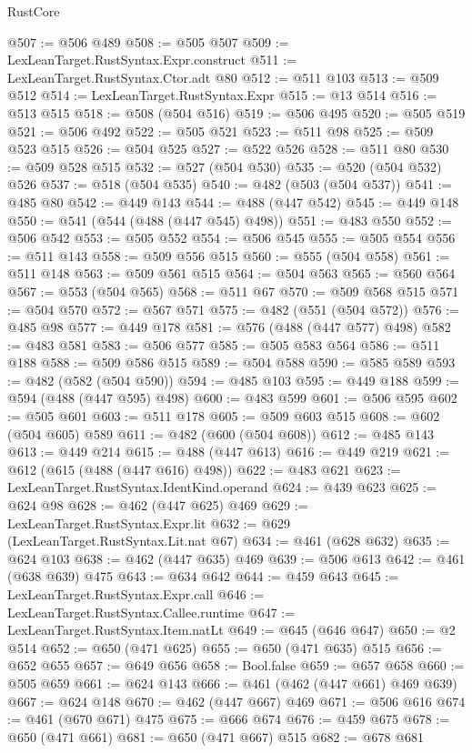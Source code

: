 \begin{lexlean}{RustCore}
\begin{coremodule}
@507 := @506 @489
@508 := @505 @507
@509 := LexLeanTarget.RustSyntax.Expr.construct
@511 := LexLeanTarget.RustSyntax.Ctor.adt @80
@512 := @511 @103
@513 := @509 @512
@514 := LexLeanTarget.RustSyntax.Expr
@515 := @13 @514
@516 := @513 @515
@518 := @508 (@504 @516)
@519 := @506 @495
@520 := @505 @519
@521 := @506 @492
@522 := @505 @521
@523 := @511 @98
@525 := @509 @523 @515
@526 := @504 @525
@527 := @522 @526
@528 := @511 @80
@530 := @509 @528 @515
@532 := @527 (@504 @530)
@535 := @520 (@504 @532) @526
@537 := @518 (@504 @535)
@540 := @482 (@503 (@504 @537))
@541 := @485 @80
@542 := @449 @143
@544 := @488 (@447 @542)
@545 := @449 @148
@550 := @541 (@544 (@488 (@447 @545) @498))
@551 := @483 @550
@552 := @506 @542
@553 := @505 @552
@554 := @506 @545
@555 := @505 @554
@556 := @511 @143
@558 := @509 @556 @515
@560 := @555 (@504 @558)
@561 := @511 @148
@563 := @509 @561 @515
@564 := @504 @563
@565 := @560 @564
@567 := @553 (@504 @565)
@568 := @511 @67
@570 := @509 @568 @515
@571 := @504 @570
@572 := @567 @571
@575 := @482 (@551 (@504 @572))
@576 := @485 @98
@577 := @449 @178
@581 := @576 (@488 (@447 @577) @498)
@582 := @483 @581
@583 := @506 @577
@585 := @505 @583 @564
@586 := @511 @188
@588 := @509 @586 @515
@589 := @504 @588
@590 := @585 @589
@593 := @482 (@582 (@504 @590))
@594 := @485 @103
@595 := @449 @188
@599 := @594 (@488 (@447 @595) @498)
@600 := @483 @599
@601 := @506 @595
@602 := @505 @601
@603 := @511 @178
@605 := @509 @603 @515
@608 := @602 (@504 @605) @589
@611 := @482 (@600 (@504 @608))
@612 := @485 @143
@613 := @449 @214
@615 := @488 (@447 @613)
@616 := @449 @219
@621 := @612 (@615 (@488 (@447 @616) @498))
@622 := @483 @621
@623 := LexLeanTarget.RustSyntax.IdentKind.operand
@624 := @439 @623
@625 := @624 @98
@628 := @462 (@447 @625) @469
@629 := LexLeanTarget.RustSyntax.Expr.lit
@632 := @629 (LexLeanTarget.RustSyntax.Lit.nat @67)
@634 := @461 (@628 @632)
@635 := @624 @103
@638 := @462 (@447 @635) @469
@639 := @506 @613
@642 := @461 (@638 @639) @475
@643 := @634 @642
@644 := @459 @643
@645 := LexLeanTarget.RustSyntax.Expr.call
@646 := LexLeanTarget.RustSyntax.Callee.runtime
@647 := LexLeanTarget.RustSyntax.Item.natLt
@649 := @645 (@646 @647)
@650 := @2 @514
@652 := @650 (@471 @625)
@655 := @650 (@471 @635) @515
@656 := @652 @655
@657 := @649 @656
@658 := Bool.false
@659 := @657 @658
@660 := @505 @659
@661 := @624 @143
@666 := @461 (@462 (@447 @661) @469 @639)
@667 := @624 @148
@670 := @462 (@447 @667) @469
@671 := @506 @616
@674 := @461 (@670 @671) @475
@675 := @666 @674
@676 := @459 @675
@678 := @650 (@471 @661)
@681 := @650 (@471 @667) @515
@682 := @678 @681

\end{coremodule}
\end{lexlean}
